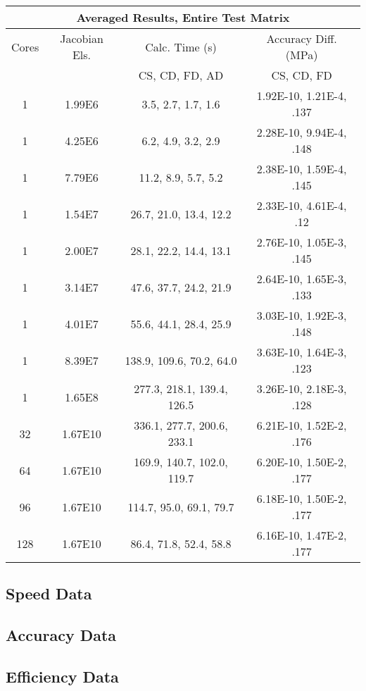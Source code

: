 \documentclass[preprint,12pt]{elsarticle}
\begin{document}
\begin{center}
    \begin{tabular}{c c c c }
    \hline
    \multicolumn{4}{c}{Averaged Results, Entire Test Matrix} \\ \hline
    Cores & Jacobian Els. & Calc. Time (s) & Accuracy Diff. (MPa)\\ 
    \multicolumn{2}{c}{} & CS, CD, FD, AD & CS, CD, FD \\ \hline 
	1 & 1.99E6  & 3.5, 2.7, 1.7, 1.6 & 1.92E-10, 1.21E-4, .137 \\ \hline
	1 & 4.25E6  & 6.2, 4.9, 3.2, 2.9 & 2.28E-10, 9.94E-4, .148 \\ \hline
	1 & 7.79E6  & 11.2, 8.9, 5.7, 5.2 & 2.38E-10, 1.59E-4, .145\\ \hline
	1 & 1.54E7  & 26.7, 21.0, 13.4, 12.2 & 2.33E-10, 4.61E-4, .12 \\ \hline
	1 & 2.00E7  & 28.1, 22.2, 14.4, 13.1 & 2.76E-10, 1.05E-3, .145 \\ \hline
	1 & 3.14E7  & 47.6, 37.7, 24.2, 21.9 & 2.64E-10, 1.65E-3, .133 \\ \hline
	1 & 4.01E7  & 55.6, 44.1, 28.4, 25.9 & 3.03E-10, 1.92E-3, .148 \\ \hline
	1 & 8.39E7  & 138.9, 109.6, 70.2, 64.0 & 3.63E-10, 1.64E-3, .123 \\ \hline
	1 & 1.65E8  & 277.3, 218.1, 139.4, 126.5 & 3.26E-10, 2.18E-3, .128 \\ \hline
	32 & 1.67E10  & 336.1, 277.7, 200.6, 233.1 & 6.21E-10, 1.52E-2, .176 \\ \hline
	64 & 1.67E10  & 169.9, 140.7, 102.0, 119.7 & 6.20E-10, 1.50E-2, .177 \\ \hline
	96 & 1.67E10  & 114.7, 95.0, 69.1, 79.7 & 6.18E-10, 1.50E-2, .177 \\ \hline
	128 & 1.67E10  & 86.4, 71.8, 52.4, 58.8 & 6.16E-10, 1.47E-2, .177 \\ \hline
    \end{tabular}
\end{center}

\subsection{Speed Data}
\subsection{Accuracy Data}
\subsection{Efficiency Data}
\end{document}
